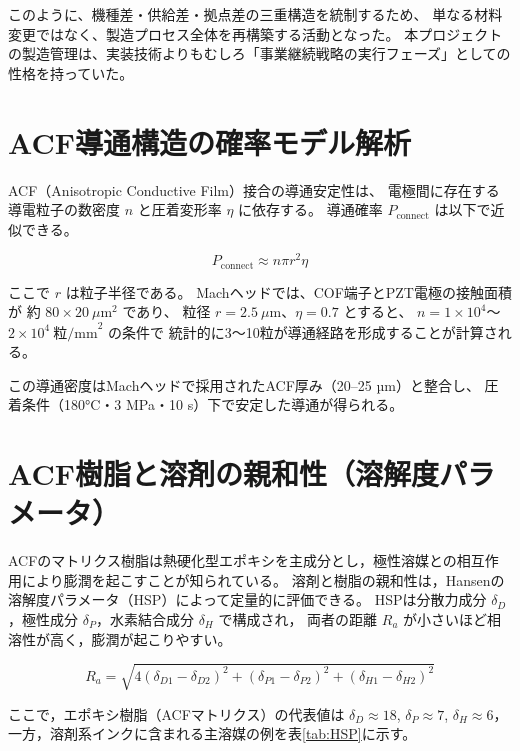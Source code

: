 \documentclass[conference]{IEEEtran}
\begin{document}
このように、機種差・供給差・拠点差の三重構造を統制するため、  
単なる材料変更ではなく、製造プロセス全体を再構築する活動となった。  
本プロジェクトの製造管理は、実装技術よりもむしろ「事業継続戦略の実行フェーズ」としての性格を持っていた。

\section{ACF導通構造の確率モデル解析}

ACF（Anisotropic Conductive Film）接合の導通安定性は、
電極間に存在する導電粒子の数密度 $n$ と圧着変形率 $\eta$ に依存する。
導通確率 $P_{\text{connect}}$ は以下で近似できる。

\begin{equation}
P_{\text{connect}} \approx n \pi r^2 \eta
\end{equation}

ここで $r$ は粒子半径である。
Machヘッドでは、COF端子とPZT電極の接触面積が
約 $80 \times 20~\mu\text{m}^2$ であり、
粒径 $r = 2.5~\mu$m、$\eta = 0.7$ とすると、
$n = 1\times10^4$〜$2\times10^4~\text{粒/mm}^2$ の条件で
統計的に3〜10粒が導通経路を形成することが計算される。

この導通密度はMachヘッドで採用されたACF厚み（20–25 µm）と整合し、
圧着条件（180°C・3 MPa・10 s）下で安定した導通が得られる。

\section{ACF樹脂と溶剤の親和性（溶解度パラメータ）}

ACFのマトリクス樹脂は熱硬化型エポキシを主成分とし，極性溶媒との相互作用により膨潤を起こすことが知られている。
溶剤と樹脂の親和性は，Hansenの溶解度パラメータ（HSP）によって定量的に評価できる。
HSPは分散力成分 $\delta_D$，極性成分 $\delta_P$，水素結合成分 $\delta_H$ で構成され，
両者の距離 $R_a$ が小さいほど相溶性が高く，膨潤が起こりやすい。

\[
R_a=\sqrt{4(\delta_{D1}-\delta_{D2})^2+(\delta_{P1}-\delta_{P2})^2+(\delta_{H1}-\delta_{H2})^2}
\]

ここで，エポキシ樹脂（ACFマトリクス）の代表値は
$\delta_D\!\approx\!18$, $\delta_P\!\approx\!7$, $\delta_H\!\approx\!6$，
一方，溶剤系インクに含まれる主溶媒の例を表\ref{tab:HSP}に示す。
\end{document}
